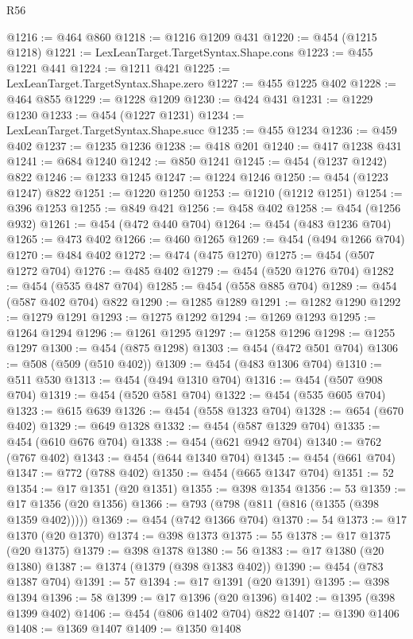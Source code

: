 \begin{lexlean}{R56}
\begin{coremodule}
@1216 := @464 @860
@1218 := @1216 @1209 @431
@1220 := @454 (@1215 @1218)
@1221 := LexLeanTarget.TargetSyntax.Shape.cons
@1223 := @455 @1221 @441
@1224 := @1211 @421
@1225 := LexLeanTarget.TargetSyntax.Shape.zero
@1227 := @455 @1225 @402
@1228 := @464 @855
@1229 := @1228 @1209
@1230 := @424 @431
@1231 := @1229 @1230
@1233 := @454 (@1227 @1231)
@1234 := LexLeanTarget.TargetSyntax.Shape.succ
@1235 := @455 @1234
@1236 := @459 @402
@1237 := @1235 @1236
@1238 := @418 @201
@1240 := @417 @1238 @431
@1241 := @684 @1240
@1242 := @850 @1241
@1245 := @454 (@1237 @1242) @822
@1246 := @1233 @1245
@1247 := @1224 @1246
@1250 := @454 (@1223 @1247) @822
@1251 := @1220 @1250
@1253 := @1210 (@1212 @1251)
@1254 := @396 @1253
@1255 := @849 @421
@1256 := @458 @402
@1258 := @454 (@1256 @932)
@1261 := @454 (@472 @440 @704)
@1264 := @454 (@483 @1236 @704)
@1265 := @473 @402
@1266 := @460 @1265
@1269 := @454 (@494 @1266 @704)
@1270 := @484 @402
@1272 := @474 (@475 @1270)
@1275 := @454 (@507 @1272 @704)
@1276 := @485 @402
@1279 := @454 (@520 @1276 @704)
@1282 := @454 (@535 @487 @704)
@1285 := @454 (@558 @885 @704)
@1289 := @454 (@587 @402 @704) @822
@1290 := @1285 @1289
@1291 := @1282 @1290
@1292 := @1279 @1291
@1293 := @1275 @1292
@1294 := @1269 @1293
@1295 := @1264 @1294
@1296 := @1261 @1295
@1297 := @1258 @1296
@1298 := @1255 @1297
@1300 := @454 (@875 @1298)
@1303 := @454 (@472 @501 @704)
@1306 := @508 (@509 (@510 @402))
@1309 := @454 (@483 @1306 @704)
@1310 := @511 @530
@1313 := @454 (@494 @1310 @704)
@1316 := @454 (@507 @908 @704)
@1319 := @454 (@520 @581 @704)
@1322 := @454 (@535 @605 @704)
@1323 := @615 @639
@1326 := @454 (@558 @1323 @704)
@1328 := @654 (@670 @402)
@1329 := @649 @1328
@1332 := @454 (@587 @1329 @704)
@1335 := @454 (@610 @676 @704)
@1338 := @454 (@621 @942 @704)
@1340 := @762 (@767 @402)
@1343 := @454 (@644 @1340 @704)
@1345 := @454 (@661 @704)
@1347 := @772 (@788 @402)
@1350 := @454 (@665 @1347 @704)
@1351 := 52
@1354 := @17 @1351 (@20 @1351)
@1355 := @398 @1354
@1356 := 53
@1359 := @17 @1356 (@20 @1356)
@1366 := @793 (@798 (@811 (@816 (@1355 (@398 @1359 @402)))))
@1369 := @454 (@742 @1366 @704)
@1370 := 54
@1373 := @17 @1370 (@20 @1370)
@1374 := @398 @1373
@1375 := 55
@1378 := @17 @1375 (@20 @1375)
@1379 := @398 @1378
@1380 := 56
@1383 := @17 @1380 (@20 @1380)
@1387 := @1374 (@1379 (@398 @1383 @402))
@1390 := @454 (@783 @1387 @704)
@1391 := 57
@1394 := @17 @1391 (@20 @1391)
@1395 := @398 @1394
@1396 := 58
@1399 := @17 @1396 (@20 @1396)
@1402 := @1395 (@398 @1399 @402)
@1406 := @454 (@806 @1402 @704) @822
@1407 := @1390 @1406
@1408 := @1369 @1407
@1409 := @1350 @1408

\end{coremodule}
\end{lexlean}
